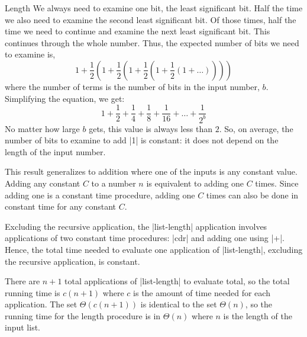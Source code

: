 \begin{schemeregion}
\begin{examplenobar}{Length}
We always need to examine one bit, the least significant bit.  Half the time we also need to examine the second least significant bit.  Of those times, half the time we need to continue and examine the next least significant bit.  This continues through the whole number.  Thus, the expected number of bits we need to examine is,
\begin{displaymath}
1 + \frac{1}{2}\left(1 + \frac{1}{2} \left(1 + \frac{1}{2}\left(1 + \frac{1}{2}\left(1 + \ldots\right)\right)\right)\right)
\end{displaymath}
where the number of terms is the number of bits in the input number, $b$.  Simplifying the equation, we get:
\begin{displaymath}
1 + \frac{1}{2} + \frac{1}{4} + \frac{1}{8} + \frac{1}{16} + \ldots + \frac{1}{2^b}
\end{displaymath}
No matter how large $b$ gets, this value is always less than $2$.  So, on average, the number of bits to examine to add \scheme|1| is constant: it does not depend on the length of the input number.   %

This result generalizes to addition where one of the inputs is any constant value.  Add\-ing any constant $C$ to a number $n$ is equivalent to adding one $C$ times.  Since adding one is a constant time procedure, adding one $C$ times can also be done in constant time for any constant $C$.  

Excluding the recursive application, the \scheme|list-length| application involves applications of two constant time procedures: \scheme|cdr| and adding one using \scheme|+|.  Hence, the total time needed to evaluate one application of \scheme|list-length|, excluding the recursive application, is constant.  %

There are $n+1$ total applications of \scheme|list-length| to evaluate total, so the total running time is $c(n+1)$ where $c$ is the amount of time needed for each application.  The set $\Theta(c(n+1))$ is identical to the set $\Theta(n)$, so the running time for the length procedure is in $\Theta(n)$ where $n$ is the length of the input list. 
\end{examplenobar}


\end{schemeregion}
